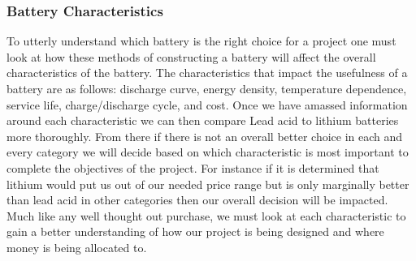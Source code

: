\subsubsection{Battery Characteristics}
To utterly understand which battery is the right choice for a project one must look at how these methods of constructing a battery will affect the overall characteristics of the battery. The characteristics that impact the usefulness of a battery are as follows: discharge curve, energy density, temperature dependence, service life, charge/discharge cycle, and cost. Once we have amassed information around each characteristic we can then compare Lead acid to lithium batteries more thoroughly. From there if there is not an overall better choice in each and every category we will decide based on which characteristic is most important to complete the objectives of the project. For instance if it is determined that lithium would put us out of our needed price range but is only marginally better than lead acid in other categories then our overall decision will be impacted. Much like any well thought out purchase, we must look at each characteristic to gain a better understanding of how our project is being designed and where money is being allocated to.

